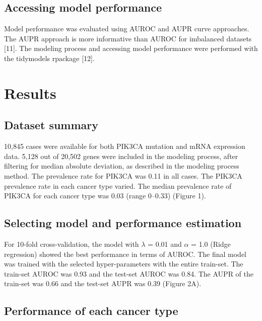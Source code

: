 \documentclass[10pt,letterpaper]{article}
\begin{document}
\hypertarget{accessing-model-performance}{%
\subsection{Accessing model
performance}\label{accessing-model-performance}}

Model performance was evaluated using AUROC and AUPR curve approaches.
The AUPR approach is more informative than AUROC for imbalanced datasets
{[}11{]}. The modeling process and accessing model performance were
performed with the tidymodels rpackage {[}12{]}.

\hypertarget{results}{%
\section{Results}\label{results}}

\hypertarget{dataset-summary}{%
\subsection{Dataset summary}\label{dataset-summary}}

10,845 cases were available for both PIK3CA mutation and mRNA expression
data. 5,128 out of 20,502 genes were included in the modeling process,
after filtering for median absolute deviation, as described in the
modeling process method. The prevalence rate for PIK3CA was 0.11 in all
cases. The PIK3CA prevalence rate in each cancer type varied. The median
prevalence rate of PIK3CA for each cancer type was 0.03 (range 0--0.33)
(Figure 1).

\hypertarget{selecting-model-and-performance-estimation}{%
\subsection{Selecting model and performance
estimation}\label{selecting-model-and-performance-estimation}}

For 10-fold cross-validation, the model with \(\lambda\) = 0.01 and
\(\alpha\) = 1.0 (Ridge regression) showed the best performance in terms
of AUROC. The final model was trained with the selected hyper-parameters
with the entire train-set. The train-set AUROC was 0.93 and the test-set
AUROC was 0.84. The AUPR of the train-set was 0.66 and the test-set AUPR
was 0.39 (Figure 2A).

\hypertarget{performance-of-each-cancer-type}{%
\subsection{Performance of each cancer
type}\label{performance-of-each-cancer-type}}
\end{document}
